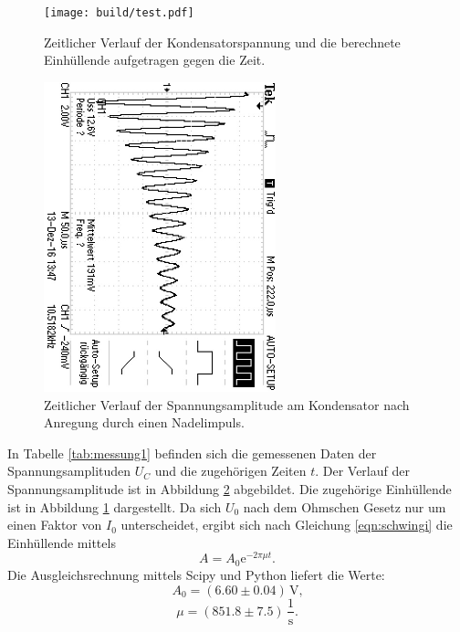 \begin{figure}
	\centering
	\texttt{[image: build/test.pdf]}
	\caption{Zeitlicher Verlauf der Kondensatorspannung und die berechnete Einhüllende aufgetragen gegen die Zeit.}
	\label{fig:einhüllende}
\end{figure}
\begin{figure}
	\includegraphics[width=0.6\textwidth,angle=90]{Bilder/a)correct/F0002TEK.JPG}
	\caption{Zeitlicher Verlauf der Spannungsamplitude am Kondensator nach Anregung durch einen Nadelimpuls.}
	\label{fig:spannungsamplitude}
\end{figure}
In Tabelle \ref{tab:messung1} befinden sich die gemessenen Daten der Spannungsamplituden $U_C$ und die zugehörigen Zeiten $t$.
Der Verlauf der Spannungsamplitude ist in Abbildung \ref{fig:spannungsamplitude} abgebildet. Die zugehörige Einhüllende ist in Abbildung \ref{fig:einhüllende} dargestellt.
Da sich $U_\text{0}$ nach dem Ohmschen Gesetz nur um einen Faktor von $I_\text{0}$ unterscheidet, ergibt sich nach Gleichung \eqref{eqn:schwingi} die Einhüllende mittels
\begin{equation}
	A=A_\text{0} \mathrm{e}^{-2 \pi \mu t} \text{.}
\end{equation}
Die Ausgleichsrechnung mittels Scipy und Python liefert die Werte:
\begin{equation*}
	A_0 =  (6.60 \pm 0.04) \,\si{\volt} \text{,}
\end{equation*}
\begin{equation*}
	\mu =  (851.8 \pm 7.5) \, \frac{1}{\si{\second}} \text{.}
\end{equation*}

